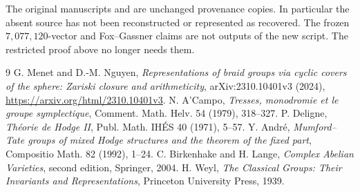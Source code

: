 \documentclass[11pt]{article}
\theoremstyle{remark}
\begin{document}
The original manuscripts and  are unchanged
provenance copies.  In particular the absent source
 has not been
reconstructed or represented as recovered.  The frozen
\(7{,}077{,}120\)-vector and Fox--Gassner claims are not outputs of the
new script.  The restricted proof above no longer needs them.

\begingroup
\small
\begin{thebibliography}{9}
\setlength{\itemsep}{3pt}
 G. Menet and D.-M. Nguyen,
\emph{Representations of braid groups via cyclic covers of the sphere:
Zariski closure and arithmeticity}, arXiv:2310.10401v3 (2024),
\url{https://arxiv.org/html/2310.10401v3}.
 N. A'Campo,
\emph{Tresses, monodromie et le groupe symplectique},
Comment. Math. Helv. 54 (1979), 318--327.
 P. Deligne, \emph{Th\'eorie de Hodge II},
Publ. Math. IH\'ES 40 (1971), 5--57.
 Y. Andr\'e,
\emph{Mumford--Tate groups of mixed Hodge structures and the theorem of
the fixed part}, Compositio Math. 82 (1992), 1--24.
 C. Birkenhake and H. Lange,
\emph{Complex Abelian Varieties}, second edition, Springer, 2004.
 H. Weyl,
\emph{The Classical Groups: Their Invariants and Representations},
Princeton University Press, 1939.
\end{thebibliography}
\endgroup
\end{document}
